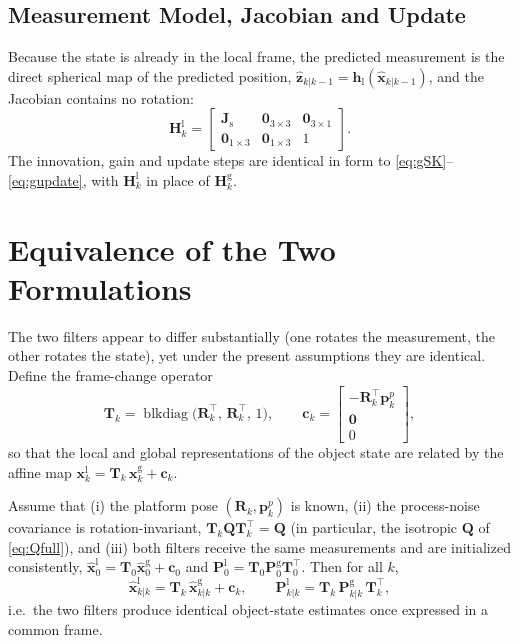 \subsection{Measurement Model, Jacobian and Update}
Because the state is already in the local frame, the predicted measurement is the
direct spherical map of the predicted position,
$\hat{\bm{z}}_{k|k-1}=\bm{h}_{\mathrm{l}}(\hat{\bm{x}}_{k|k-1})$, and the Jacobian
contains no rotation:
\begin{equation}
  \bm{H}^{\mathrm{l}}_k =
  \begin{bmatrix} \bm{J}_{\mathrm{s}} & \bm{0}_{3\times3} & \bm{0}_{3\times1}\\
                  \bm{0}_{1\times3} & \bm{0}_{1\times3} & 1 \end{bmatrix}.
  \label{eq:Hlocal}
\end{equation}
The innovation, gain and update steps are identical in form to
\eqref{eq:gSK}--\eqref{eq:gupdate}, with $\bm{H}^{\mathrm{l}}_k$ in place of
$\bm{H}^{\mathrm{g}}_k$.

\section{Equivalence of the Two Formulations}
\label{sec:equiv}

The two filters appear to differ substantially (one rotates the measurement,
the other rotates the state), yet under the present assumptions they are
identical. Define the frame-change operator
\begin{equation}
  \bm{T}_k = \operatorname{blkdiag}\!\big(\bm{R}_k^{\top},\,\bm{R}_k^{\top},\,1\big),
  \qquad
  \bm{c}_k = \begin{bmatrix} -\bm{R}_k^{\top}\bm{p}^{p}_k \\ \bm{0} \\ 0 \end{bmatrix},
\end{equation}
so that the local and global representations of the object state are related by
the affine map $\bm{x}^{\mathrm{l}}_k = \bm{T}_k\,\bm{x}^{\mathrm{g}}_k + \bm{c}_k$.

\begin{proposition}[Equivalence]
\label{prop:equiv}
Assume that (i) the platform pose $(\bm{R}_k,\bm{p}^{p}_k)$ is known, (ii) the
process-noise covariance is rotation-invariant, $\bm{T}_k\bm{Q}\bm{T}_k^{\top}=\bm{Q}$
(in particular, the isotropic $\bm{Q}$ of \eqref{eq:Qfull}), and (iii) both
filters receive the same measurements and are initialized consistently,
$\hat{\bm{x}}^{\mathrm{l}}_{0}=\bm{T}_0\hat{\bm{x}}^{\mathrm{g}}_{0}+\bm{c}_0$ and
$\bm{P}^{\mathrm{l}}_{0}=\bm{T}_0\bm{P}^{\mathrm{g}}_{0}\bm{T}_0^{\top}$. Then for
all $k$,
\begin{equation}
  \hat{\bm{x}}^{\mathrm{l}}_{k|k} = \bm{T}_k\,\hat{\bm{x}}^{\mathrm{g}}_{k|k} + \bm{c}_k,
  \qquad
  \bm{P}^{\mathrm{l}}_{k|k} = \bm{T}_k\,\bm{P}^{\mathrm{g}}_{k|k}\,\bm{T}_k^{\top},
\end{equation}
i.e.\ the two filters produce identical object-state estimates once expressed in a
common frame.
\end{proposition}

